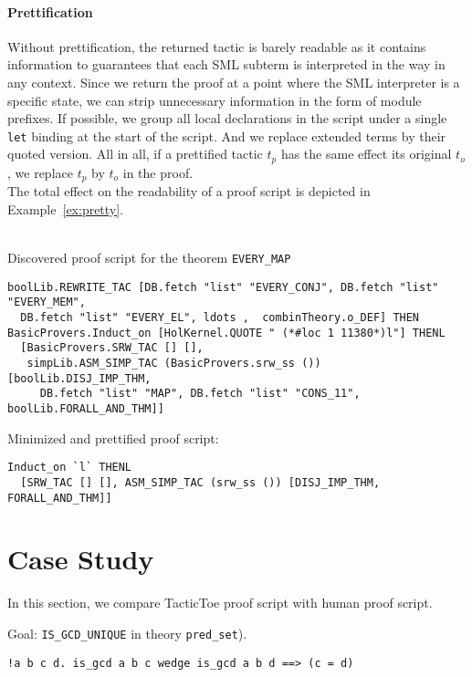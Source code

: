 \documentclass[runningheads,a4paper,draft]{svjour3}
\def\sml{\textsf{SML}\xspace}
\def\tactictoe{\textsf{TacticToe}\xspace}
\begin{document}
\paragraph{Prettification}
Without prettification, the returned tactic is barely readable as it contains
information to guarantees that each \sml subterm is interpreted in the way in
any context. Since we return the proof at a point where the \sml interpreter is
a specific state, we can strip unnecessary information in the form of
module prefixes. If possible, we group all local declarations in the
script under a single \texttt{let} binding at the start of the script. And we
replace extended terms by their quoted version.
All in all, if a prettified tactic $t_p$ has the same effect its original
$t_o$, we replace $t_p$ by $t_o$ in the proof.\\

The total effect on the readability of a proof script is depicted in
Example~\ref{ex:pretty}.
\begin{example}\label{ex:pretty}\ \\
Discovered proof script for the theorem \texttt{EVERY\_MAP}
\begin{lstlisting}[language=SMLSmall]
boolLib.REWRITE_TAC [DB.fetch "list" "EVERY_CONJ", DB.fetch "list" "EVERY_MEM", 
  DB.fetch "list" "EVERY_EL", ldots ,  combinTheory.o_DEF] THEN 
BasicProvers.Induct_on [HolKernel.QUOTE " (*#loc 1 11380*)l"] THENL
  [BasicProvers.SRW_TAC [] [],
   simpLib.ASM_SIMP_TAC (BasicProvers.srw_ss ()) [boolLib.DISJ_IMP_THM, 
     DB.fetch "list" "MAP", DB.fetch "list" "CONS_11", boolLib.FORALL_AND_THM]]

\end{lstlisting}
Minimized and prettified proof script:
\begin{lstlisting}[language=SMLSmall]
Induct_on `l` THENL 
  [SRW_TAC [] [], ASM_SIMP_TAC (srw_ss ()) [DISJ_IMP_THM, FORALL_AND_THM]]
\end{lstlisting}
\end{example}

\section{Case Study}
In this section, we compare \tactictoe proof script with human proof script.

Goal: \texttt{IS\_GCD\_UNIQUE} in theory \texttt{pred\_set}).
\begin{lstlisting}[language=SMLSmall]
!a b c d. is_gcd a b c wedge is_gcd a b d ==> (c = d)
\end{lstlisting}
\end{document}
